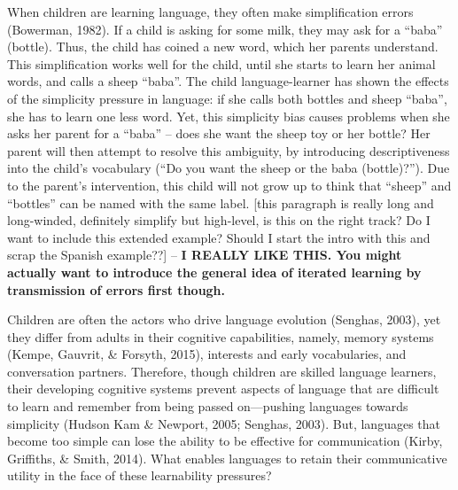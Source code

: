 \documentclass[10pt, letterpaper]{article}
\begin{document}
When children are learning language, they often make simplification
errors (Bowerman, 1982). If a child is asking for some milk, they may
ask for a ``baba'' (bottle). Thus, the child has coined a new word,
which her parents understand. This simplification works well for the
child, until she starts to learn her animal words, and calls a sheep
``baba''. The child language-learner has shown the effects of the
simplicity pressure in language: if she calls both bottles and sheep
``baba'', she has to learn one less word. Yet, this simplicity bias
causes problems when she asks her parent for a ``baba'' -- does she want
the sheep toy or her bottle? Her parent will then attempt to resolve
this ambiguity, by introducing descriptiveness into the child's
vocabulary (``Do you want the sheep or the baba (bottle)?''). Due to the
parent's intervention, this child will not grow up to think that
``sheep'' and ``bottles'' can be named with the same label. {[}this
paragraph is really long and long-winded, definitely simplify but
high-level, is this on the right track? Do I want to include this
extended example? Should I start the intro with this and scrap the
Spanish example??{]} -- \textbf{I REALLY LIKE THIS. You might actually
want to introduce the general idea of iterated learning by transmission
of errors first though.}

Children are often the actors who drive language evolution (Senghas,
2003), yet they differ from adults in their cognitive capabilities,
namely, memory systems (Kempe, Gauvrit, \& Forsyth, 2015), interests and
early vocabularies, and conversation partners. Therefore, though
children are skilled language learners, their developing cognitive
systems prevent aspects of language that are difficult to learn and
remember from being passed on---pushing languages towards simplicity
(Hudson Kam \& Newport, 2005; Senghas, 2003). But, languages that become
too simple can lose the ability to be effective for communication
(Kirby, Griffiths, \& Smith, 2014). What enables languages to retain
their communicative utility in the face of these learnability pressures?
\end{document}
